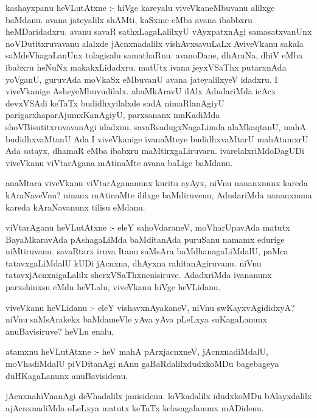 \documentclass{article}
\begin{document}
\begin{mn}
kashayxpanu heVLutAtxne :- hiVge kareyalu viveVkaneMbuvanu  alilxge baMdanu. 
avana jateyalilx shAMti, kaSxme eMba avana ibabbxru heMDaridadxru. avanu 
savaR sathxLagaLalilxyU   vAyxpatxnAgi  samasatxvanUnx noVDutitxruvavanu 
alalxde jAcnxnadalilx vishAvxsavuLaLx AviveVkanu sakala saMdeVhagaLanUnx 
tolagisalu samathaRnu.  avanoDane, dhAraNa, dhiV eMba ibabxru heNuNx makakxLidadxru.
matUtx ivana jeyxVSaThx putarxnAda yoVganU, guruvAda moVkaSx eMbuvanU avana 
jateyalilxyeV idadxru.  I viveVkanige AsheyeMbuvudilalx.  ahaMkAravU ilAlx 
AdudariMda icAcx devxVSAdi keTaTx budidhxyilalxde sadA nimaRlanAgiyU 
parigarxhaparAjumxKanAgiyU, parxsananx muKadiMda shoVBisutitxruvavanAgi
idadxnu.  savaRsadugxNagaLimda  alaMkaqtanU, mahA budidhxvaMtanU Ada I 
viveVkanige  ivanaMteye budidhxvaMtarU mahAtamxrU Ada satayx, dhamaR eMba 
ibabxru maMtirxgaLiruvaru. ivarelalxriMdoDagUDi  viveVkanu viVtarAgana 
mAtinaMte avana baLige baMdanu.
\end{mn}

\begin{mn}
anaMtara viveVkanu  viVtarAgananunx kuritu ayAyx, niVnu nananxnunx kareda 
kAraNaveVnu?  ninanx mAtinaMte ililxge baMdiruvenu, AdudariMda nananxnuna 
kareda kAraNavanunx tilisu eMdanu.
\end{mn}

\begin{mn}
viVtarAganu heVLutAtxne :- eleY sahoVdaraneV, moVharUpavAda matutx BayaMkaravAda
pAshagaLiMda baMditanAda puruSanu namamx edurige niMtiruvanu.  savaRtarx 
iruva  Itanu saMsAra baMdhanagaLiMdalU, paMca tatavxgaLiMdalU  kUDi jAcnxna,
 dhAyxna rahitanAgiruvanu. niVnu  tatavxjAcnxnigaLalilx sherxVSaThxnenisiruve. 
 AdadxriMda ivananunx parxshinxsu eMdu heVLalu, viveVkanu hiVge heVLidanu.
\end{mn}

\begin{mn}
viveVkanu heVLidanu :- eleY vishavxnAyakaneV, niVnu swKayxvAgididxyA? niVnu
saMsArakekx baMdameVle yAva yAva pLeLxya suKagaLanunx anuBavisiruve? heVLu enalu,
\end{mn}

\begin{mn}
atamxnu heVLutAtxne :- heV mahA pArxjacnxneV, jAcnxnadiMdalU, moVhadiMdalU 
piVDitanAgi nAnu gaBaRdalilxdudxkoMDu bagebageya duHKagaLanunx anuBavisidenu.
\end{mn}

\begin{mn}
jAcnxnahiVnanAgi deVhadalilx janisidenu. loVkadalilx idudxkoMDu bAlayxdalilx 
ajAcnxnadiMda oLeLxya matutx keTaTx kelasagalanunx  mADidenu.
\end{mn}
\end{document}
